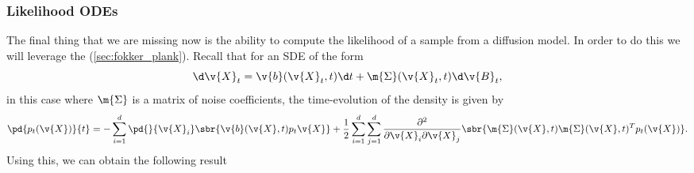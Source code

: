 \subsubsection{Likelihood ODEs}
\label{sec:likelihood-ode}
The final thing that we are missing now is the ability to compute the likelihood of a sample from a diffusion model.
In order to do this we will leverage the  (\cref{sec:fokker_plank}).
Recall that for an SDE of the form \[\d \v{X}_t = \v{b}(\v{X}_t, t) \d t + \m{\Sigma}(\v{X}_t, t) \d \v{B}_t ,\] in this case where \(\m{\Sigma}\) is a matrix of noise coefficients, the time-evolution of the density is given by
\[ \pd{p_t(\v{X})}{t} = -\sum_{i=1}^d \pd{}{\v{X}_i}\sbr{\v{b}(\v{X}, t) p_t{\v{X}}} + \frac{1}{2} \sum_{i=1}^d \sum_{j=1}^d \frac{\partial^2}{\partial \v{X}_i \partial \v{X}_j} \sbr{\m{\Sigma}(\v{X}, t) \m{\Sigma}(\v{X}, t)^T p_t(\v{X})} .\]
Using this, we can obtain the following result

